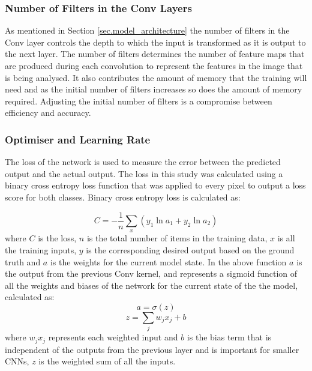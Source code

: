 \subsubsection{Number of Filters in the Conv Layers}
As mentioned in Section \ref{sec.model_architecture} the number of filters in the Conv layer controls the depth to which the input is transformed as it is output to the next layer. The number of filters determines the number of feature maps that are produced during each convolution to represent the features in the image that is being analysed. It also contributes the amount of memory that the training will need and as the initial number of filters increases so does the amount of memory required. Adjusting the initial number of filters is a compromise between efficiency and accuracy. 

\subsubsection{Optimiser and Learning Rate}
The loss of the network is used to measure the error between the predicted output and the actual output. The loss in this study was calculated using a binary cross entropy loss function that was applied to every pixel to output a loss score for both classes. Binary cross entropy loss is calculated as:

\[C = -\frac{1}{n} \sum\limits_x (y_1 \ln a_1 + y_2 \ln a_2)\]
where $C$ is the loss, $n$ is the total number of items in the training data, $x$ is all the training inputs, $y$ is the corresponding desired output based on the ground truth and $a$ is the weights for the current model state. In the above function $a$ is the output from the previous Conv kernel, and represents a sigmoid function of all the weights and biases of the network for the current state of the the model, calculated as: 
\[a =
\sigma(z)\]
\[z =
\sum_j w_j x_j+b\]
where $w_jx_j$ represents each weighted input and $b$ is the bias term that is independent of the outputs from the previous layer and is important for smaller CNNs, $z$ is the weighted sum of all the inputs. 


